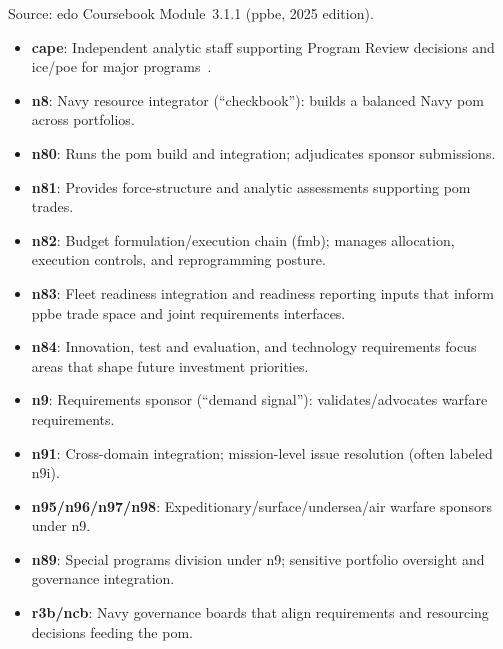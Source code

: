 \documentclass[../main.tex]{subfiles}
\begin{document}
\begin{description}[style=nextline, labelsep=0.5em, font=\bfseries]
\item[\textbf{\ac{ppbe} resource sponsors.}]
        Source: \ac{edo} Coursebook Module~3.1.1 (\ac{ppbe}, 2025 edition).
        \begin{itemize}
          \item \textbf{\ac{cape}}: Independent analytic staff supporting Program Review decisions and \ac{ice}/\ac{poe} for major programs~\autocite{USC-139c-CAPE,edo-3-1-1-ppbe-2025}.
          \item \textbf{\ac{n8}}: Navy resource integrator (``checkbook''): builds a balanced Navy \ac{pom} across portfolios.
          \item \textbf{\ac{n80}}: Runs the \ac{pom} build and integration; adjudicates sponsor submissions.
          \item \textbf{\ac{n81}}: Provides force-structure and analytic assessments supporting \ac{pom} trades.
          \item \textbf{\ac{n82}}: Budget formulation/execution chain (\ac*{fmb}); manages allocation, execution controls, and reprogramming posture.
          \item \textbf{\ac{n83}}: Fleet readiness integration and readiness reporting inputs that inform \ac{ppbe} trade space and joint requirements interfaces.
          \item \textbf{\ac{n84}}: Innovation, test and evaluation, and technology requirements focus areas that shape future investment priorities.
          \item \textbf{\ac{n9}}: Requirements sponsor (``demand signal''): validates/advocates warfare requirements.
          \item \textbf{\ac{n91}}: Cross-domain integration; mission-level issue resolution (often labeled \ac*{n9i}).
          \item \textbf{\ac{n95}/\ac{n96}/\ac{n97}/\ac{n98}}: Expeditionary/surface/undersea/air warfare sponsors under \ac{n9}.
          \item \textbf{\ac{n89}}: Special programs division under \ac{n9}; sensitive portfolio oversight and governance integration.
          \item \textbf{\ac{r3b}/\ac{ncb}}: Navy governance boards that align requirements and resourcing decisions feeding the \ac{pom}.
        \end{itemize}


\end{description}
\end{document}
